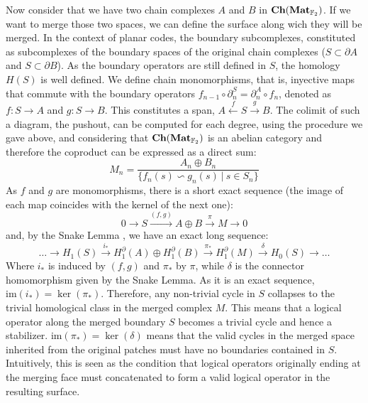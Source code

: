 \documentclass[12pt, twoside, openany]{book}
\newcommand{\catname}[1]{{\normalfont\textbf{#1}}}
\newcommand{\Ch}{\catname{Ch}}
\newcommand{\Mat}{\catname{Mat}}
\begin{document}
Now consider that we have two chain complexes $A$ and $B$ in $\Ch(\Mat_{\mathbb{F}_2})$. If we want to merge those two spaces, we can define the surface along wich they will be merged. In the context of planar codes, the boundary subcomplexes, constituted as subcomplexes of the boundary spaces of the original chain complexes ($S \subset \partial A$ and $S \subset \partial B$). As the boundary operators are still defined in $S$, the homology $H(S)$ is well defined. We define chain monomorphisms, that is, inyective maps that commute with the boundary operators $f_{n-1} \circ \partial_n^S = \partial_n^{A} \circ f_n$, denoted as $f: S \rightarrow A$ and $g: S \rightarrow B$. This constitutes a span, $A \xleftarrow{f} S \xrightarrow{g} B$. The colimit of such a diagram, the pushout, can be computed for each degree, using the procedure we gave above, and considering that $\Ch(\Mat_{\mathbb{F}_2})$ is an abelian category and therefore the coproduct can be expressed as a direct sum:
\begin{equation}
    M_n = \frac{A_n \oplus B_n}{\{f_n(s) \backsim g_n(s) \ | \ s \in S_n\}}
\end{equation}
As $f$ and $g$ are monomorphisms, there is a short exact sequence (the image of each map coincides with the kernel of the next one):
\begin{equation} 
    0 \to S \xrightarrow{(f, g)} A \oplus B \xrightarrow{\pi} M \to 0 
\end{equation}
and, by the Snake Lemma \cite{cowtan2025fastfaulttolerantlogicalmeasurements}, we have an exact long sequence:
\begin{equation} 
    \dots \to H_1(S) \xrightarrow{i_*} H_1^\partial(A) \oplus H_1^\partial(B) \xrightarrow{\pi_*} H_1^\partial(M) \xrightarrow{\delta} H_0(S) \to \dots
\end{equation}
Where $i_*$ is induced by $(f,g)$ and $\pi_*$ by $\pi$, while $\delta$ is the connector homomorphism given by the Snake Lemma.  As it is an exact sequence, $\text{im}(i_*) = \ker (\pi_*)$. Therefore, any non-trivial cycle in $S$ collapses to the trivial homological class in the merged complex $M$. This means that a logical operator along the merged boundary $S$ becomes a trivial cycle and hence a stabilizer. $\text{im}(\pi_*) = \ker(\delta)$ means that the valid cycles in the merged space inherited from the original patches must have no boundaries contained in $S$. Intuitively, this is seen as the condition that logical operators originally ending at the merging face must concatenated to form a valid logical operator in the resulting surface.
\end{document}
